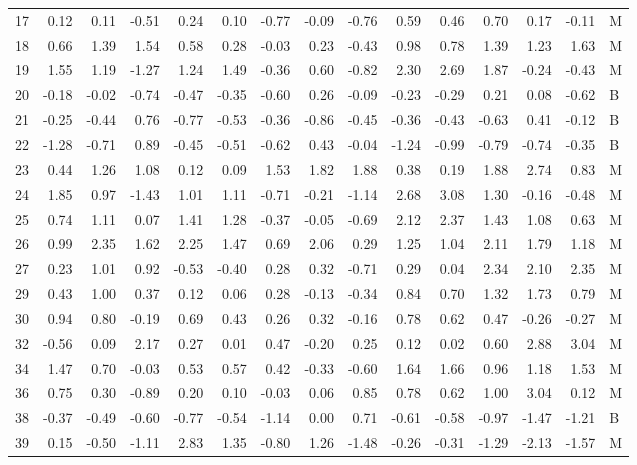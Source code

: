 \begin{table}[ht]
\begin{tabular}{rrrrrrrrrrrrrrl}
  17 & 0.12 & 0.11 & -0.51 & 0.24 & 0.10 & -0.77 & -0.09 & -0.76 & 0.59 & 0.46 & 0.70 & 0.17 & -0.11 & M \\ 
  18 & 0.66 & 1.39 & 1.54 & 0.58 & 0.28 & -0.03 & 0.23 & -0.43 & 0.98 & 0.78 & 1.39 & 1.23 & 1.63 & M \\ 
  19 & 1.55 & 1.19 & -1.27 & 1.24 & 1.49 & -0.36 & 0.60 & -0.82 & 2.30 & 2.69 & 1.87 & -0.24 & -0.43 & M \\ 
  20 & -0.18 & -0.02 & -0.74 & -0.47 & -0.35 & -0.60 & 0.26 & -0.09 & -0.23 & -0.29 & 0.21 & 0.08 & -0.62 & B \\ 
  21 & -0.25 & -0.44 & 0.76 & -0.77 & -0.53 & -0.36 & -0.86 & -0.45 & -0.36 & -0.43 & -0.63 & 0.41 & -0.12 & B \\ 
  22 & -1.28 & -0.71 & 0.89 & -0.45 & -0.51 & -0.62 & 0.43 & -0.04 & -1.24 & -0.99 & -0.79 & -0.74 & -0.35 & B \\ 
  23 & 0.44 & 1.26 & 1.08 & 0.12 & 0.09 & 1.53 & 1.82 & 1.88 & 0.38 & 0.19 & 1.88 & 2.74 & 0.83 & M \\ 
  24 & 1.85 & 0.97 & -1.43 & 1.01 & 1.11 & -0.71 & -0.21 & -1.14 & 2.68 & 3.08 & 1.30 & -0.16 & -0.48 & M \\ 
  25 & 0.74 & 1.11 & 0.07 & 1.41 & 1.28 & -0.37 & -0.05 & -0.69 & 2.12 & 2.37 & 1.43 & 1.08 & 0.63 & M \\ 
  26 & 0.99 & 2.35 & 1.62 & 2.25 & 1.47 & 0.69 & 2.06 & 0.29 & 1.25 & 1.04 & 2.11 & 1.79 & 1.18 & M \\ 
  27 & 0.23 & 1.01 & 0.92 & -0.53 & -0.40 & 0.28 & 0.32 & -0.71 & 0.29 & 0.04 & 2.34 & 2.10 & 2.35 & M \\ 
  29 & 0.43 & 1.00 & 0.37 & 0.12 & 0.06 & 0.28 & -0.13 & -0.34 & 0.84 & 0.70 & 1.32 & 1.73 & 0.79 & M \\ 
  30 & 0.94 & 0.80 & -0.19 & 0.69 & 0.43 & 0.26 & 0.32 & -0.16 & 0.78 & 0.62 & 0.47 & -0.26 & -0.27 & M \\ 
  32 & -0.56 & 0.09 & 2.17 & 0.27 & 0.01 & 0.47 & -0.20 & 0.25 & 0.12 & 0.02 & 0.60 & 2.88 & 3.04 & M \\ 
  34 & 1.47 & 0.70 & -0.03 & 0.53 & 0.57 & 0.42 & -0.33 & -0.60 & 1.64 & 1.66 & 0.96 & 1.18 & 1.53 & M \\ 
  36 & 0.75 & 0.30 & -0.89 & 0.20 & 0.10 & -0.03 & 0.06 & 0.85 & 0.78 & 0.62 & 1.00 & 3.04 & 0.12 & M \\ 
  38 & -0.37 & -0.49 & -0.60 & -0.77 & -0.54 & -1.14 & 0.00 & 0.71 & -0.61 & -0.58 & -0.97 & -1.47 & -1.21 & B \\ 
  39 & 0.15 & -0.50 & -1.11 & 2.83 & 1.35 & -0.80 & 1.26 & -1.48 & -0.26 & -0.31 & -1.29 & -2.13 & -1.57 & M \\ 

\end{tabular}
\end{table}
